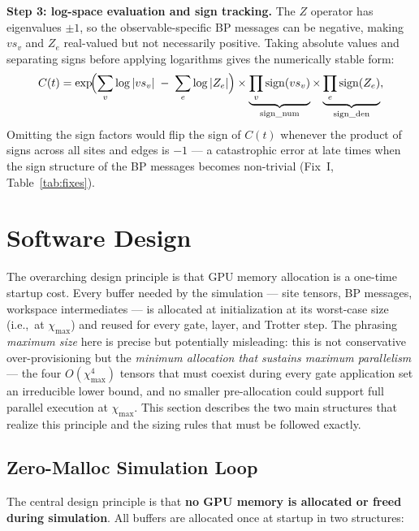 \documentclass[11pt]{article}
\newcommand{\chimax}{\chi_{\mathrm{max}}}
\begin{document}
\textbf{Step 3: log-space evaluation and sign tracking.}
The $Z$ operator has eigenvalues $\pm 1$, so the observable-specific BP messages
can be negative, making $vs_v$ and $Z_e$ real-valued but not necessarily positive.
Taking absolute values and separating signs before applying logarithms gives the
numerically stable form:
\begin{equation}
  C(t) = \exp\!\Bigl(\sum_v \log|vs_v| \;-\; \sum_e \log|Z_e|\Bigr)
         \times \underbrace{\prod_v \mathrm{sign}(vs_v)}_{\mathrm{sign\_num}}
         \times \underbrace{\prod_e \mathrm{sign}(Z_e)}_{\mathrm{sign\_den}},
  \label{eq:bethe}
\end{equation}
Omitting the sign factors would flip the sign of $C(t)$ whenever the product
of signs across all sites and edges is $-1$ — a catastrophic error at late times
when the sign structure of the BP messages becomes non-trivial (Fix~I,
Table~\ref{tab:fixes}).

\section{Software Design}
\label{sec:design}

The overarching design principle is that GPU memory allocation is a one-time
startup cost. Every buffer needed by the simulation --- site tensors, BP messages,
workspace intermediates --- is allocated at initialization at its worst-case size
(i.e.,\ at $\chimax$) and reused for every gate, layer, and Trotter step.
The phrasing \emph{maximum size} here is precise but potentially misleading:
this is not conservative over-provisioning but the \emph{minimum allocation
that sustains maximum parallelism} --- the four $O(\chimax^4)$ tensors that
must coexist during every gate application set an irreducible lower bound,
and no smaller pre-allocation could support full parallel execution at $\chimax$.
This section describes the two main structures that realize this principle
and the sizing rules that must be followed exactly.

\subsection{Zero-Malloc Simulation Loop}

The central design principle is that \textbf{no GPU memory is allocated or freed
during simulation}. All buffers are allocated once at startup in two structures:
\end{document}
